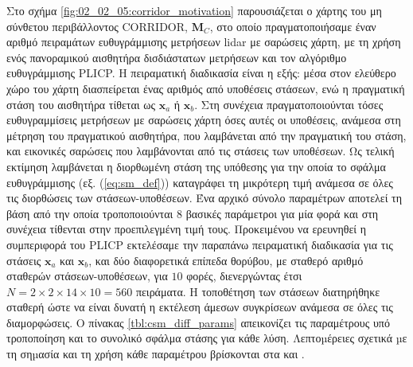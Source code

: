 Στο σχήμα \ref{fig:02_02_05:corridor_motivation} παρουσιάζεται ο χάρτης του μη
σύνθετου περιβάλλοντος CORRIDOR, $\bm{M}_C$, στο οποίο πραγματοποιήσαμε έναν
αριθμό πειραμάτων ευθυγράμμισης μετρήσεων lidar με σαρώσεις χάρτη, με τη χρήση
ενός πανοραμικού αισθητήρα δισδιάστατων μετρήσεων και τον αλγόριθμο
ευθυγράμμισης PLICP. Η πειραματική διαδικασία είναι η εξής: μέσα στον ελεύθερο
χώρο του χάρτη διασπείρεται ένας αριθμός από υποθέσεις στάσεων, ενώ η
πραγματική στάση του αισθητήρα τίθεται ως $\bm{x}_a$ ή $\bm{x}_b$. Στη συνέχεια
πραγματοποιούνται τόσες ευθυγραμμίσεις μετρήσεων με σαρώσεις χάρτη όσες αυτές
οι υποθέσεις, ανάμεσα στη μέτρηση του πραγματικού αισθητήρα, που λαμβάνεται από
την πραγματική του στάση, και εικονικές σαρώσεις που λαμβάνονται από τις
στάσεις των υποθέσεων. Ως τελική εκτίμηση λαμβάνεται η διορθωμένη στάση της
υπόθεσης για την οποία το σφάλμα ευθυγράμμισης (εξ. (\ref{eq:sm_def}))
καταγράφει τη μικρότερη τιμή ανάμεσα σε όλες τις διορθώσεις των
στάσεων-υποθέσεων. Ένα αρχικό σύνολο παραμέτρων αποτελεί τη βάση από την οποία
τροποποιούνται $8$ βασικές παράμετροι για μία φορά και στη συνέχεια τίθενται
στην προεπιλεγμένη τιμή τους. Προκειμένου να ερευνηθεί η συμπεριφορά του PLICP
εκτελέσαμε την παραπάνω πειραματική διαδικασία για τις στάσεις $\bm{x}_a$ και
$\bm{x}_b$, και δύο διαφορετικά επίπεδα θορύβου, με σταθερό αριθμό σταθερών
στάσεων-υποθέσεων, για $10$ φορές, διενεργώντας έτσι $N = 2 \times 2 \times 14
\times 10 = 560$ πειράματα. Η τοποθέτηση των στάσεων διατηρήθηκε σταθερή ώστε
να είναι δυνατή η εκτέλεση άμεσων συγκρίσεων ανάμεσα σε όλες τις διαμορφώσεις.
Ο πίνακας \ref{tbl:csm_diff_params} απεικονίζει τις παραμέτρους υπό τροποποίηση
και το συνολικό σφάλμα στάσης για κάθε λύση.  Λεπτοµέρειες σχετικά µε τη
σηµασία και τη χρήση κάθε παραμέτρου βρίσκονται στα \cite{csm_manual1} και
\cite{csm_manual2}.


